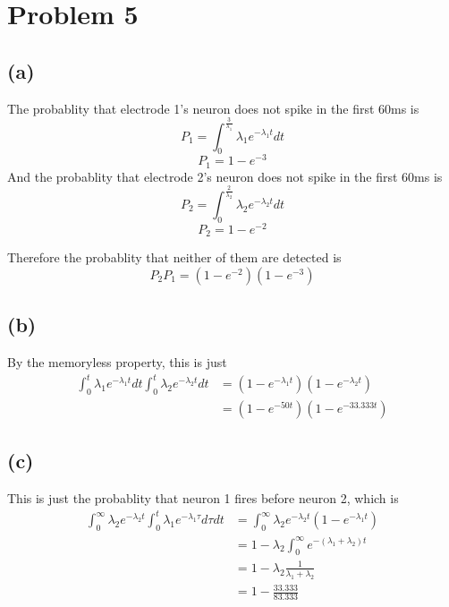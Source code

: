 \documentclass[12pt]{article}
\begin{document}
\section*{Problem 5}
\subsection*{(a)}
The probablity that electrode 1's neuron does not spike in the first 60ms is 
$$P_{1}=\int_{0}^{\frac{3}{\lambda_1}}\lambda_1 e^{-\lambda_1 t}dt$$
$$P_{1}=1-e^{-3}$$
And the probablity that electrode 2's neuron does not spike in the first 60ms is 
$$P_{2}=\int_{0}^{\frac{2}{\lambda_2}}\lambda_2 e^{-\lambda_2 t}dt$$
$$P_{2}=1-e^{-2}$$

Therefore the probablity that neither of them are detected is 
$$P_{2}P_{1}=(1-e^{-2})(1-e^{-3})$$
\subsection*{(b)}
By the memoryless property, this is just
\begin{align*}
    \int_{0}^{t}\lambda_1 e^{-\lambda_1 t}dt\int_{0}^{t}\lambda_2 e^{-\lambda_2 t}dt
    &=(1-e^{-\lambda_1t})(1-e^{-\lambda_2t})\\
    &=\boxed{(1-e^{-50t})(1-e^{-33.333t})}
\end{align*}
\subsection*{(c)}
This is just the probablity that neuron 1 fires before
neuron 2, which is 
\begin{align*}
    \int_{0}^{\infty}\lambda_2e^{-\lambda_2 t}\int_{0}^{t}\lambda_1e^{-\lambda_1 \tau}d\tau dt
    &=\int_{0}^{\infty}\lambda_2e^{-\lambda_2 t}(1-e^{-\lambda_1 t})\\
    &=1-\lambda_2\int_{0}^{\infty}e^{-(\lambda_1+\lambda_2) t}\\
    &=1-\lambda_2\frac{1}{\lambda_1+\lambda_2}\\
    &=\boxed{1-\frac{33.333}{83.333}}
\end{align*}
\end{document}
